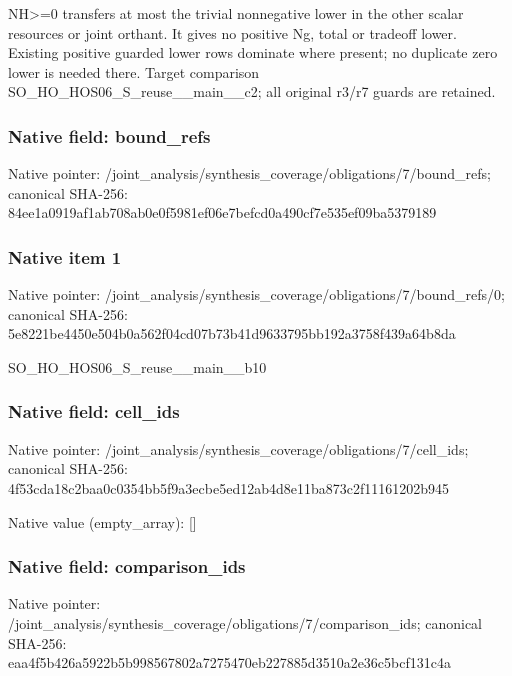 \documentclass[10pt,a4paper]{article}
\begin{document}
\begingroup\raggedright\sloppy NH>=\allowbreak{}0 transfers at most the trivial nonnegative lower in the other scalar resources or joint orthant. It gives no positive Ng,\allowbreak{} total or tradeoff lower. Existing positive guarded lower rows dominate where present;\allowbreak{} no duplicate zero lower is needed there. Target comparison SO\_\allowbreak{}HO\_\allowbreak{}HOS06\_\allowbreak{}S\_\allowbreak{}reuse\_\allowbreak{}\_\allowbreak{}main\_\allowbreak{}\_\allowbreak{}c2;\allowbreak{} all original r3/\allowbreak{}r7 guards are retained.\par\endgroup

\subsubsection{Native field: bound\_\allowbreak{}refs}
Native pointer: /joint\_\allowbreak{}analysis/synthesis\_\allowbreak{}coverage/obligations/7/bound\_\allowbreak{}refs; canonical SHA-256: 84ee1a0919af1ab708ab0e0f5981ef06e7befcd0a490cf7e535ef09ba5379189

\subsubsection{Native item 1}
Native pointer: /joint\_\allowbreak{}analysis/synthesis\_\allowbreak{}coverage/obligations/7/bound\_\allowbreak{}refs/0; canonical SHA-256: 5e8221be4450e504b0a562f04cd07b73b41d9633795bb192a3758f439a64b8da

\begingroup\raggedright\sloppy SO\_\allowbreak{}HO\_\allowbreak{}HOS06\_\allowbreak{}S\_\allowbreak{}reuse\_\allowbreak{}\_\allowbreak{}main\_\allowbreak{}\_\allowbreak{}b10\par\endgroup

\subsubsection{Native field: cell\_\allowbreak{}ids}
Native pointer: /joint\_\allowbreak{}analysis/synthesis\_\allowbreak{}coverage/obligations/7/cell\_\allowbreak{}ids; canonical SHA-256: 4f53cda18c2baa0c0354bb5f9a3ecbe5ed12ab4d8e11ba873c2f11161202b945

Native value (empty\_\allowbreak{}array): []

\subsubsection{Native field: comparison\_\allowbreak{}ids}
Native pointer: /joint\_\allowbreak{}analysis/synthesis\_\allowbreak{}coverage/obligations/7/comparison\_\allowbreak{}ids; canonical SHA-256: eaa4f5b426a5922b5b998567802a7275470eb227885d3510a2e36c5bcf131c4a
\end{document}
